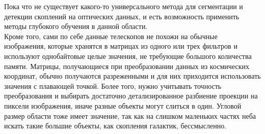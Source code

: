 Пока что не существует какого-то универсального метода для сегментации и детекции скоплений 
на оптических данных, и есть возможность применить методы глубокого обучения в данной области.\\

Кроме того, сами по себе данные телескопов не похожи на обычные изображения, которые хранятся в 
матрицах из одного или трех фильтров и используют однобайтовые целые значения, не требующие 
большого количества памяти. Матрицы, получающиеся при преобразовании данных из космических 
координат, обычно получаются разреженными и для них приходится использовать значения с плавающей 
точкой. Более того, нужно учитывать точность преобразования и выбирать достаточно детализированное 
разбиение проекции на пиксели изображения, иначе разные объекты могут слиться в один. Угловой 
размер области тоже имеет значение, так как на слишком маленьких частях неба искать такие большие 
объекты, как скопления галактик, бессмысленно.\\
